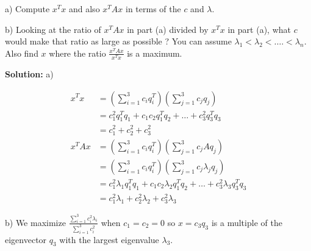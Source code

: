 \documentclass[12pt]{article}
\begin{document}
	a) Compute $x^Tx$ and also $x^TAx$ in terms of the $c$ and $\lambda$.
	
	b) Looking at the ratio of $x^TAx$ in part (a) divided by $x^Tx$ in part (a), what $c$ would make that ratio as large as possible ? You can assume $\lambda_1 < \lambda_2 < .\dots < \lambda_n$. Also find $x$ where the ratio $\frac{x^TAx}{x^Tx}$ is a maximum.
	
	\begin{framed}
		\textbf{Solution:}
		a) 
		
		\begin{align}
			x^Tx &= \left(\sum_{i = 1}^{3} c_iq_i^T\right)\left(\sum_{j = 1}^{3} c_jq_j\right) \\
			&= c_1^2 q_1^T q_1 + c_1 c_2 q_1^T q_2 + \dots + c_3^2 q_3^T q_3 \\
			&= c_1^2 + c_2^2 + c_3^2 \\
			x^TAx &= \left(\sum_{i = 1}^{3} c_iq_i^T\right)\left(\sum_{j = 1}^{3} c_jAq_j\right) \\
			&= \left(\sum_{i = 1}^{3} c_iq_i^T\right)\left(\sum_{j = 1}^{3} c_j \lambda_j q_j\right) \\
			&= c_1^2 \lambda_1 q_1^T q_1 + c_1 c_2 \lambda_2 q_1^T q_2 + \dots + c_3^2 \lambda_3 q_3^T q_3 \\
			&= c_1^2 \lambda_1 + c_2^2 \lambda_2 + c_3^2 \lambda_3
		\end{align}
		
		b) We maximize $\frac{\sum_{i=1}^{3} c_i^2 \lambda_i}{\sum_{i=1}^{3} c_i^2}$ when $c_1 = c_2 = 0$ so $x = c_3q_3$ is a multiple of the eigenvector $q_3$ with the largest eigenvalue $\lambda_3$.
	\end{framed}
	
\end{document}
